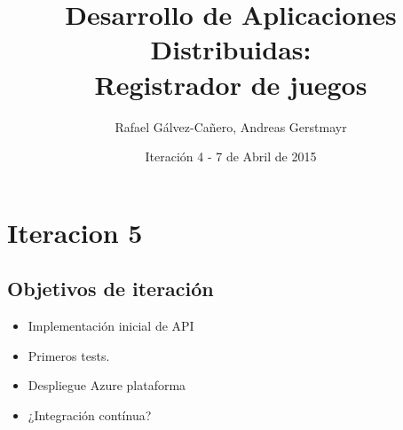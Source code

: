 \documentclass[12pt,a4paper]{report}
\title{Desarrollo de Aplicaciones Distribuidas: \\ Registrador de juegos}
\author{Rafael Gálvez-Cañero, Andreas Gerstmayr}
\date{Iteración 4 - 7 de Abril de 2015} %
\begin{document}
\maketitle
\tableofcontents
\listoffigures
\listoftables










\chapter{Iteracion 5}
\section{Objetivos de iteración}
\begin{itemize}
  \item Implementación inicial de API
  \item Primeros tests.
  \item Despliegue Azure plataforma
  \item ¿Integración contínua?
\end{itemize}
\end{document}
